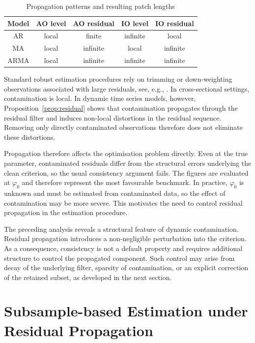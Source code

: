 \documentclass[12pt]{article}
\numberwithin{equation}{section}
\begin{document}
\begin{table}[htbp]
\centering
\caption{Propagation patterns and resulting patch lengths}
\label{tab:propagation_patterns}
\begin{tabular}{ccccc}
\hline
Model & AO level & AO residual & IO level & IO residual \\
\hline
AR   & local    & finite    & infinite & local \\
MA   & local    & infinite  & local    & infinite \\
ARMA & local    & infinite  & infinite & infinite \\
\hline
\end{tabular}
\end{table}

Standard robust estimation procedures rely on trimming or down-weighting observations associated with large residuals, see, e.g., \citet{Huber1964, Ro84, Maronna2006}. 
In cross-sectional settings, contamination is local. 
In dynamic time series models, however, Proposition~\ref{prop:residual} shows that contamination propagates through the residual filter and induces non-local distortions in the residual sequence. 
Removing only directly contaminated observations therefore does not eliminate these distortions.

Propagation therefore affects the optimisation problem directly.
Even at the true parameter, contaminated residuals differ from the structural errors underlying the clean criterion, so the usual consistency argument fails.
The figures are evaluated at $\varphi_0$ and therefore represent the most favourable benchmark. 
In practice, $\varphi_0$ is unknown and must be estimated from contaminated data, so the effect of contamination may be more severe.
This motivates the need to control residual propagation in the estimation procedure.

The preceding analysis reveals a structural feature of dynamic contamination.
Residual propagation introduces a non-negligible perturbation into the criterion.
As a consequence, consistency is not a default property and requires additional structure to control the propagated component.
Such control may arise from decay of the underlying filter, sparsity of contamination, or an explicit correction of the retained subset, as developed in the next section.


\section{Subsample-based Estimation under Residual Propagation}\label{sec:estimation}
\end{document}

